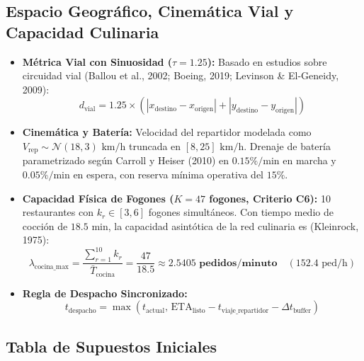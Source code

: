 \documentclass[11pt,letterpaper]{article}
\begin{document}
\subsection{Espacio Geográfico, Cinemática Vial y Capacidad Culinaria}
\begin{itemize}[leftmargin=1.5em, itemsep=0.3em]
    \item \textbf{Métrica Vial con Sinuosidad ($\tau = 1.25$):} Basado en estudios sobre circuidad vial (Ballou et al., 2002; Boeing, 2019; Levinson \& El-Geneidy, 2009):
    \begin{equation}
        d_{\text{vial}} = 1.25 \times \left( |x_{\text{destino}} - x_{\text{origen}}| + |y_{\text{destino}} - y_{\text{origen}}| \right)
    \end{equation}
    \item \textbf{Cinemática y Batería:} Velocidad del repartidor modelada como $V_{\text{rep}} \sim \mathcal{N}(18, 3)\text{ km/h}$ truncada en $[8, 25]\text{ km/h}$. Drenaje de batería parametrizado según Carroll y Heiser (2010) en $0.15\%/\text{min}$ en marcha y $0.05\%/\text{min}$ en espera, con reserva mínima operativa del $15\%$.
    \item \textbf{Capacidad Física de Fogones ($K = 47$ fogones, Criterio C6):} 10 restaurantes con $k_r \in [3, 6]$ fogones simultáneos. Con tiempo medio de cocción de $18.5\text{ min}$, la capacidad asintótica de la red culinaria es (Kleinrock, 1975):
    \begin{equation}
        \lambda_{\text{cocina\_max}} = \frac{\sum_{r=1}^{10} k_r}{\bar{T}_{\text{cocina}}} = \frac{47}{18.5} \approx \mathbf{2.5405\text{ pedidos/minuto}} \quad (152.4\text{ ped/h})
    \end{equation}
    \item \textbf{Regla de Despacho Sincronizado:}
    \begin{equation}
        t_{\text{despacho}} = \max\left(t_{\text{actual}},\, \text{ETA}_{\text{listo}} - t_{\text{viaje\_repartidor}} - \Delta t_{\text{buffer}}\right)
    \end{equation}
\end{itemize}

\subsection{Tabla de Supuestos Iniciales}
\end{document}
